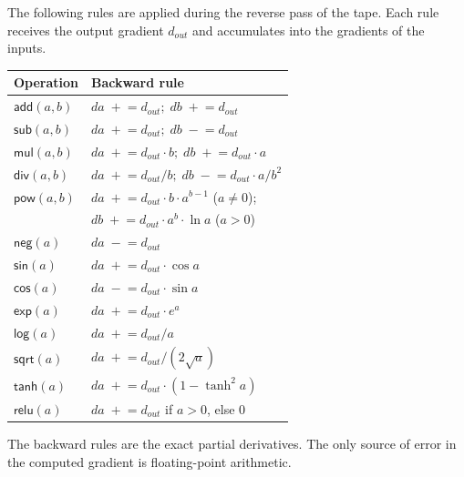 \documentclass{lmcs}
\theoremstyle{plain}
\theoremstyle{definition}
\begin{document}
The following rules are applied during the reverse pass of the tape. Each
rule receives the output gradient $d_{\mathit{out}}$ and accumulates into
the gradients of the inputs.

\begin{center}
\begin{tabular}{l l}
\toprule
Operation & Backward rule \\
\midrule
$\mathsf{add}(a, b)$ &
  $\mathit{da} \;+\!\!= d_{\mathit{out}};\;
   \mathit{db} \;+\!\!= d_{\mathit{out}}$ \\[3pt]
$\mathsf{sub}(a, b)$ &
  $\mathit{da} \;+\!\!= d_{\mathit{out}};\;
   \mathit{db} \;-\!\!= d_{\mathit{out}}$ \\[3pt]
$\mathsf{mul}(a, b)$ &
  $\mathit{da} \;+\!\!= d_{\mathit{out}} \cdot b;\;
   \mathit{db} \;+\!\!= d_{\mathit{out}} \cdot a$ \\[3pt]
$\mathsf{div}(a, b)$ &
  $\mathit{da} \;+\!\!= d_{\mathit{out}} / b;\;
   \mathit{db} \;-\!\!= d_{\mathit{out}} \cdot a / b^2$ \\[3pt]
$\mathsf{pow}(a, b)$ &
  $\mathit{da} \;+\!\!= d_{\mathit{out}} \cdot b \cdot a^{b-1}$ ($a \neq 0$);
  \\
& $\mathit{db} \;+\!\!= d_{\mathit{out}} \cdot a^b \cdot \ln a$ ($a > 0$) \\[3pt]
$\mathsf{neg}(a)$ &
  $\mathit{da} \;-\!\!= d_{\mathit{out}}$ \\[3pt]
$\mathsf{sin}(a)$ &
  $\mathit{da} \;+\!\!= d_{\mathit{out}} \cdot \cos a$ \\[3pt]
$\mathsf{cos}(a)$ &
  $\mathit{da} \;-\!\!= d_{\mathit{out}} \cdot \sin a$ \\[3pt]
$\mathsf{exp}(a)$ &
  $\mathit{da} \;+\!\!= d_{\mathit{out}} \cdot e^a$ \\[3pt]
$\mathsf{log}(a)$ &
  $\mathit{da} \;+\!\!= d_{\mathit{out}} / a$ \\[3pt]
$\mathsf{sqrt}(a)$ &
  $\mathit{da} \;+\!\!= d_{\mathit{out}} / (2\sqrt{a})$ \\[3pt]
$\mathsf{tanh}(a)$ &
  $\mathit{da} \;+\!\!= d_{\mathit{out}} \cdot (1 - \tanh^2 a)$ \\[3pt]
$\mathsf{relu}(a)$ &
  $\mathit{da} \;+\!\!= d_{\mathit{out}}$ if $a > 0$, else $0$ \\
\bottomrule
\end{tabular}
\end{center}

The backward rules are the exact partial derivatives. The only source of
error in the computed gradient is floating-point arithmetic.



\end{document}
